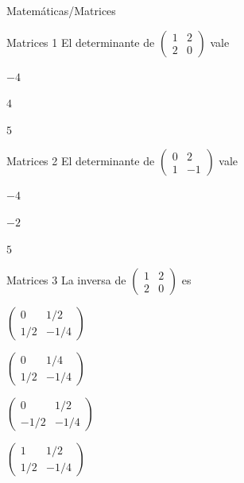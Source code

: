\documentclass[12pt]{article}
\begin{document}

\begin{quiz}{Matemáticas/Matrices}

 
 	\begin{multi}[shuffle=true,numbering=none]%
		{Matrices 1}
	 	El determinante de $\begin{pmatrix}
	 	1 & 2 \\ 
	 	2 & 0
	 	\end{pmatrix}$ vale
		\item* $-4$ 
		\item $4$
		\item $5$
 	\end{multi}
 
 	\begin{multi}[shuffle=true,numbering=none]%
		{Matrices 2}
	 	El determinante de $\begin{pmatrix}
	 	0 & 2 \\ 
	 	1 & -1
	 	\end{pmatrix}$ vale
		\item $-4$ 
		\item* $-2$
		\item $5$
 	\end{multi}	 
	
 	\begin{multi}[shuffle=true,numbering=none]%
		{Matrices 3}
	 	La inversa de $\begin{pmatrix}
	 	1 & 2 \\ 
	 	2 & 0
	 	\end{pmatrix}$ es
		\item* $\begin{pmatrix} 0 & 1/2 \\ 1/2 & -1/4 \end{pmatrix}$
		\item $\begin{pmatrix} 0 & 1/4 \\ 1/2 & -1/4 \end{pmatrix}$	
		\item $\begin{pmatrix} 0 & 1/2 \\ -1/2 & -1/4 \end{pmatrix}$
		\item $\begin{pmatrix} 1 & 1/2 \\ 1/2 & -1/4 \end{pmatrix}$
 	\end{multi}	


\end{quiz}
\end{document}
